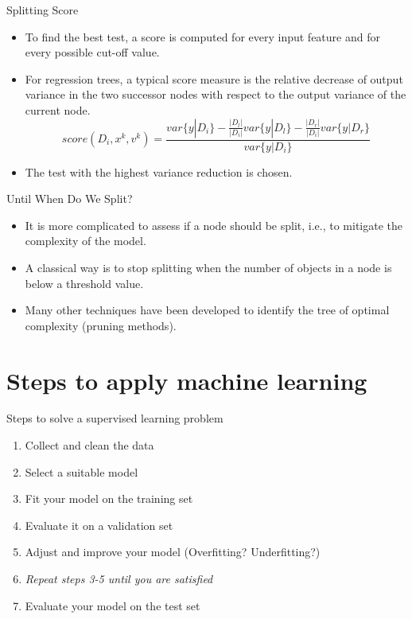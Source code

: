 \begin{frame}{Splitting Score}
    \begin{itemize}
        \item To find the best test, a score is computed for every input feature and for every possible cut-off value.
        \item For regression trees, a typical score measure is the relative decrease of output variance in the two successor nodes with respect to the output variance of the current node.
        $$score(D_i, x^k, v^k) = \frac{var\{y|D_i\} - \frac{|D_l|}{|D_i|} var\{y|D_l\} - \frac{|D_r|}{|D_i|} var\{y|D_r\}}{var\{y|D_i\}}$$
        \item The test with the highest variance reduction is chosen. 
    \end{itemize}
\end{frame}

\begin{frame}{Until When Do We Split?}
    \begin{itemize}
        \item It is more complicated to assess if a node should be split, i.e., to mitigate the complexity of the model.
        \item A classical way is to stop splitting when the number of objects in a node is below a threshold value.
        \item Many other techniques have been developed to identify the tree of optimal complexity (pruning methods).
    \end{itemize}
\end{frame}


\section{Steps to apply machine learning}

\begin{frame}{Steps to solve a supervised learning problem}

  \begin{enumerate}
    \item Collect and clean the data
    \item Select a suitable model
    \item Fit your model on the training set 
    \item Evaluate it on a validation set
    \item Adjust and improve your model (Overfitting? Underfitting?)
    \item \textit{Repeat steps 3-5 until you are satisfied}
    \item Evaluate your model on the test set
  \end{enumerate}
\end{frame}

